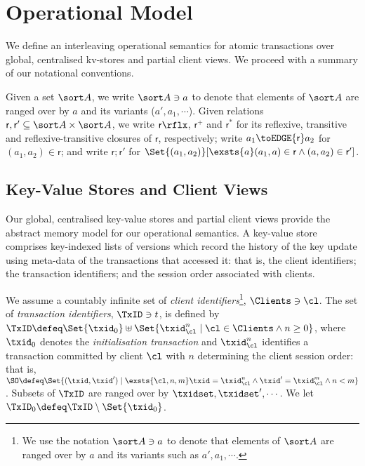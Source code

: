 \section{Operational Model}
\label{sec:model}

We define an interleaving operational semantics for atomic transactions over
global, centralised kv-stores and partial client views. 
We proceed with a summary of our notational conventions.

Given a set $\sort A$, we write $\sort A \ni a$ to denote that elements of $\sort A$ are ranged over by $a$ and its variants (\eg $a', a_1, \cdots$). 
Given relations $\mathsf r, \mathsf r' \subseteq \sort A \times \sort A$,
we write $\mathsf r\rflx$, $\mathsf r^+$ and $\mathsf r^*$ for its reflexive, transitive and reflexive-transitive closures of $\mathsf r$, respectively;
write $a_1 \toEDGE{\mathsf r} a_2$ for $(a_1, a_2) \in \mathsf r$;
and write \( \mathsf r; \mathsf r'\) for \( \Set{(a_1,a_2)}[\exsts{a} (a_1,a) \in \mathsf r\land (a,a_2) \in \mathsf r']\).


\subsection{Key-Value Stores and Client Views}
\label{subsec:kvstores}
\label{sec:mkvs-view}
Our global, centralised key-value stores and partial client views
provide the abstract memory model for our operational semantics. A
key-value store comprises key-indexed lists of versions which record
the history of the key update using meta-data of the
transactions that accessed it: that is,  the client identifiers;
the transaction identifiers; and the session order associated with
clients. 





We assume a countably infinite set of \emph{client identifiers}\footnote{ We use the notation
 $\sort A \ni a$ to denote that elements of $\sort A$ are ranged over
  by $a$ and its variants such as $a', a_1, \cdots$.},
$\Clients \ni \cl$.
The set of \emph{transaction identifiers}, $\TxID \ni t$, 
 is defined by
$\TxID \defeq  \Set{\txid_{0}} \uplus \Set{ \txid_{\cl}^{n} \mid \cl
  \in \Clients \land n \geq 0 }$, 
where  $\txid_0$ denotes  the  \emph{initialisation transaction}
and $\txid_{\cl}^{n}$ identifies a transaction committed by client
$\cl$ with $n$  determining  the client session order: that is, $\SO \defeq \Set{ (\txid, \txid') \mid \exsts{ \cl, n,m } \txid =
\txid_{\cl}^{n} \land \txid' = \txid_{\cl}^{m} \land n < m}$.
Subsets of $\TxID$  are ranged over by $\txidset, \txidset', \cdots$. 
We let $\TxID_{0} \defeq \TxID \setminus \Set{\txid_0}$. 

